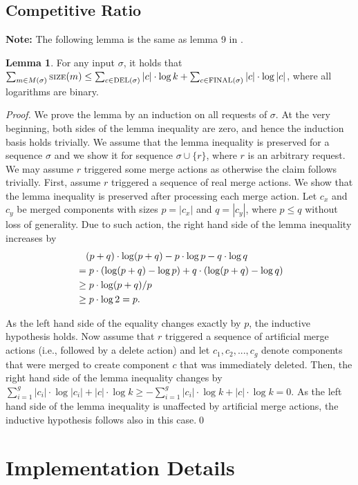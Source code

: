 \documentclass[xcolor=dvipsnames, tikz, 11pt]{article}
\newcommand{\nl}{\newline}
\newcommand{\size}{\text{\scriptsize SIZE}}
\newcommand{\del}{\text{\scriptsize DEL}}
\newcommand{\final}{\text{\scriptsize FINAL}}
\theoremstyle{definition}
\newtheorem{lemma}[defi]{Lemma}
\begin{document}
	
\subsection{Competitive Ratio}

\textbf{Note:} The following lemma is the same as lemma 9 in \cite{Avin2015}.
\begin{lemma}
	\label{size_lemma}
	For any input $\sigma$, it holds that $\sum_{m\in M(\sigma)}\size{}(m)\leq\sum_{c\in\del(\sigma)}|c|\cdot \log k+\sum_{c\in\final(\sigma)}|c|\cdot\log|c|$, where all logarithms are binary.
\end{lemma}
\textit{Proof.} We prove the lemma by an induction on all requests of $\sigma$. At the very beginning, both sides of the lemma inequality are zero, and hence the induction basis holds trivially. We assume that the lemma inequality is preserved for a sequence $\sigma$ and we show it for sequence $\sigma\cup\{r\}$, where $r$ is an arbitrary request. We may assume $r$ triggered some merge actions as otherwise the claim follows trivially.\nl
First, assume $r$ triggered a sequence of real merge actions. We show that the lemma inequality is preserved after processing each merge action. Let $c_x$ and $c_y$ be merged components with sizes $p=|c_x|$ and $q=|c_y|$, where $p\leq q$ without loss of generality. Due to such action, the right hand side of the lemma inequality increases by
\begin{align*}	
&\text{\quad}(p+q)\cdot\log(p+q)-p\cdot\log p-q\cdot\log q\\
&=p\cdot(\log(p+q)-\log p)+q\cdot(\log(p+q)-\log q)\\
&\geq p\cdot\log(p+q)/p\\
&\geq p\cdot\log 2=p.
\end{align*}

As the left hand side of the equality changes exactly by $p$, the inductive hypothesis holds.\nl
Now assume that $r$ triggered a sequence of artificial merge actions (i.e., followed by a delete action) and let $c_1,c_2,...,c_g$ denote components that were merged to create component $c$ that was immediately deleted. Then, the right hand side of the lemma inequality changes by $\sum_{i=1}^g|c_i|\cdot\log|c_i|+|c|\cdot\log k\geq-\sum_{i=1}^g|c_i|\cdot\log k+|c|\cdot\log k=0$. As the left hand side of the lemma inequality is unaffected by artificial merge actions, the inductive hypothesis follows also in this case.\qed

\section{Implementation Details}
\label{implDetSection}
\end{document}
